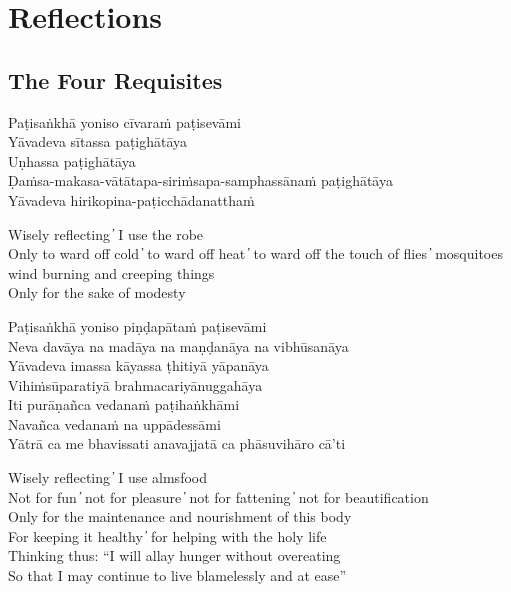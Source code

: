 
\chapter{Reflections}

\section{The Four Requisites}

\begin{leader}
\end{leader}

Paṭisaṅkhā yoniso cīvaraṁ paṭisevāmi\\
Yāvadeva sītassa paṭighātāya\\
Uṇhassa paṭighātāya\\
Ḍaṁsa-makasa-vātātapa-siriṁsapa-samphassānaṁ paṭighātāya\\
Yāvadeva hirikopina-paṭicchādanatthaṁ

\begin{english}
  Wisely reflecting  ̓  I use the robe\\
  Only to ward off cold  ̓  to ward off heat  ̓  to ward off the touch of flies  ̓  mosquitoes wind burning and creeping things\\
  Only for the sake of modesty
\end{english}

Paṭisaṅkhā yoniso piṇḍapātaṁ paṭisevāmi\\
Neva davāya na madāya na maṇḍanāya na vibhūsanāya\\
Yāvadeva imassa kāyassa ṭhitiyā yāpanāya\\
Vihiṁsūparatiyā brahmacariyānuggahāya\\
Iti purāṇañca vedanaṁ paṭihaṅkhāmi\\
Navañca vedanaṁ na uppādessāmi\\
Yātrā ca me bhavissati anavajjatā ca phāsuvihāro cā’ti

\begin{english}
  Wisely reflecting  ̓  I use almsfood\\
  Not for fun  ̓  not for pleasure  ̓  not for fattening  ̓  not for beautification\\
  Only for the maintenance and nourishment of this body\\
  For keeping it healthy  ̓  for helping with the holy life\\
  Thinking thus: “I will allay hunger without overeating\\
  So that I may continue to live blamelessly and at ease”
\end{english}

